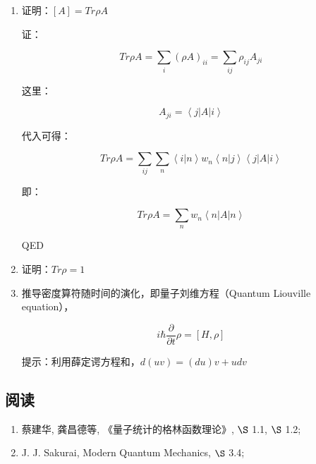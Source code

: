 \begin{enumerate}

\item

证明：$[A] = Tr \rho A$

证：

\begin{equation}
Tr \rho A = \sum_i (\rho A)_{ii} = \sum_{ij} \rho_{ij} A_{ji} 
\end{equation}

这里：

\begin{equation}
A_{ji} = \left\langle j | A | i \right\rangle
\end{equation}

代入可得：

\begin{equation}
Tr \rho A = \sum_{ij} \sum_n   \left\langle i  | n \right\rangle w_n \left\langle n | j \right\rangle \left\langle j | A | i \right\rangle
\end{equation}

即：

\begin{equation}
Tr \rho A =  \sum_n   w_n \left\langle n | A | n \right\rangle
\end{equation}

QED

\item 

证明：$Tr \rho =1$

\item

推导密度算符随时间的演化，即量子刘维方程（Quantum Liouville equation），

\begin{equation}
i \hbar \frac{\partial }{\partial t } \rho = [H, \rho]
\end{equation}

提示：利用薛定谔方程和，$d (uv) = (du) v + u dv$

\end{enumerate}


\subsection*{阅读}

\begin{enumerate}
\item 

蔡建华, 龚昌德等, 《量子统计的格林函数理论》, $\S$ 1.1, $\S$ 1.2;

\item

J. J. Sakurai, Modern Quantum Mechanics, $\S$ 3.4;

\end{enumerate}




